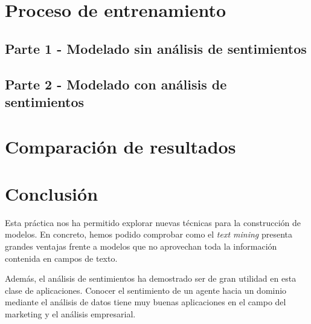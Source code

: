 \documentclass[12pt]{report} %
\begin{document}
\chapter{Proceso de entrenamiento}
\label{chap:train}

\section{Parte 1 - Modelado sin análisis de sentimientos}
\label{sec:parte1}

\section{Parte 2 - Modelado con análisis de sentimientos}
\label{sec:parte2}

\chapter{Comparación de resultados}
\label{chap:resultados}

\chapter{Conclusión}
\label{chap:conclusion}

Esta práctica nos ha permitido explorar nuevas técnicas para la construcción de modelos. En concreto, hemos podido comprobar como el \textit{text mining} presenta grandes ventajas frente a modelos que no aprovechan toda la información contenida en campos de texto.

Además, el análisis de sentimientos ha demostrado ser de gran utilidad en esta clase de aplicaciones. Conocer el sentimiento de un agente hacia un dominio mediante el análisis de datos tiene muy buenas aplicaciones en el campo del marketing y el análisis empresarial.


\clearpage

{}
\label{chap:bibliography}
\printbibliography




\end{document}

